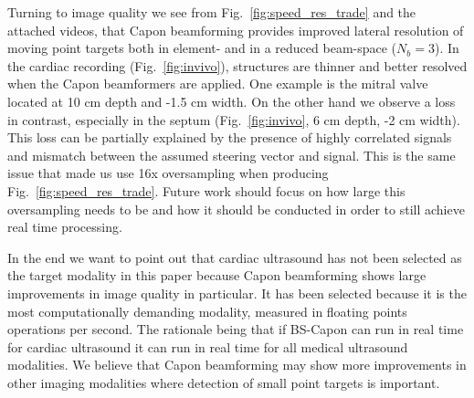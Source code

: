 \documentclass[journal]{IEEEtran}
\begin{document}
Turning to image quality we see from Fig.\ \ref{fig:speed_res_trade} and the attached videos, that Capon beamforming provides improved lateral resolution of moving point targets both in element- and in a reduced beam-space ($N_b=3$). In the cardiac recording (Fig.\ \ref{fig:invivo}), structures are thinner and better resolved when the Capon beamformers are applied. One example is the mitral valve located at 10 cm depth and -1.5 cm width. On the other hand we observe a loss in contrast, especially in the septum (Fig.\ \ref{fig:invivo}, 6 cm depth, -2 cm width). This loss can be partially explained by the presence of highly correlated signals and mismatch between the assumed steering vector and signal. This is the same issue that made us use 16x oversampling when producing Fig.\ \ref{fig:speed_res_trade}. Future work should focus on how large this oversampling needs to be and how it should be conducted in order to still achieve real time processing.

In the end we want to point out that cardiac ultrasound has not been selected as the target modality in this paper because Capon beamforming shows large improvements in image quality in particular. It has been selected because it is the most computationally demanding modality, measured in floating points operations per second. The rationale being that if BS-Capon can run in real time for cardiac ultrasound it can run in real time for all medical ultrasound modalities. We believe that Capon beamforming may show more improvements in other imaging modalities where detection of small point targets is important.



\end{document}
